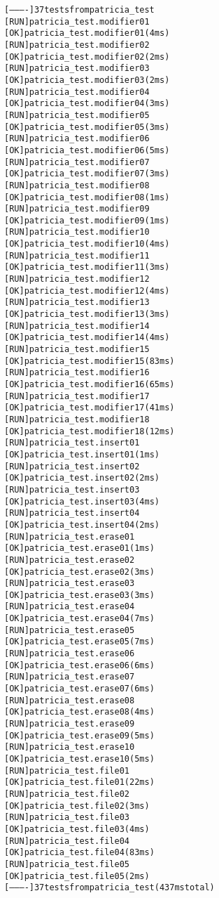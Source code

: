 \begin{alltt}
[----------] 37 tests from patricia_test
[ RUN      ] patricia_test.modifier01
[       OK ] patricia_test.modifier01 (4 ms)
[ RUN      ] patricia_test.modifier02
[       OK ] patricia_test.modifier02 (2 ms)
[ RUN      ] patricia_test.modifier03
[       OK ] patricia_test.modifier03 (2 ms)
[ RUN      ] patricia_test.modifier04
[       OK ] patricia_test.modifier04 (3 ms)
[ RUN      ] patricia_test.modifier05
[       OK ] patricia_test.modifier05 (3 ms)
[ RUN      ] patricia_test.modifier06
[       OK ] patricia_test.modifier06 (5 ms)
[ RUN      ] patricia_test.modifier07
[       OK ] patricia_test.modifier07 (3 ms)
[ RUN      ] patricia_test.modifier08
[       OK ] patricia_test.modifier08 (1 ms)
[ RUN      ] patricia_test.modifier09
[       OK ] patricia_test.modifier09 (1 ms)
[ RUN      ] patricia_test.modifier10
[       OK ] patricia_test.modifier10 (4 ms)
[ RUN      ] patricia_test.modifier11
[       OK ] patricia_test.modifier11 (3 ms)
[ RUN      ] patricia_test.modifier12
[       OK ] patricia_test.modifier12 (4 ms)
[ RUN      ] patricia_test.modifier13
[       OK ] patricia_test.modifier13 (3 ms)
[ RUN      ] patricia_test.modifier14
[       OK ] patricia_test.modifier14 (4 ms)
[ RUN      ] patricia_test.modifier15
[       OK ] patricia_test.modifier15 (83 ms)
[ RUN      ] patricia_test.modifier16
[       OK ] patricia_test.modifier16 (65 ms)
[ RUN      ] patricia_test.modifier17
[       OK ] patricia_test.modifier17 (41 ms)
[ RUN      ] patricia_test.modifier18
[       OK ] patricia_test.modifier18 (12 ms)
[ RUN      ] patricia_test.insert01
[       OK ] patricia_test.insert01 (1 ms)
[ RUN      ] patricia_test.insert02
[       OK ] patricia_test.insert02 (2 ms)
[ RUN      ] patricia_test.insert03
[       OK ] patricia_test.insert03 (4 ms)
[ RUN      ] patricia_test.insert04
[       OK ] patricia_test.insert04 (2 ms)
[ RUN      ] patricia_test.erase01
[       OK ] patricia_test.erase01 (1 ms)
[ RUN      ] patricia_test.erase02
[       OK ] patricia_test.erase02 (3 ms)
[ RUN      ] patricia_test.erase03
[       OK ] patricia_test.erase03 (3 ms)
[ RUN      ] patricia_test.erase04
[       OK ] patricia_test.erase04 (7 ms)
[ RUN      ] patricia_test.erase05
[       OK ] patricia_test.erase05 (7 ms)
[ RUN      ] patricia_test.erase06
[       OK ] patricia_test.erase06 (6 ms)
[ RUN      ] patricia_test.erase07
[       OK ] patricia_test.erase07 (6 ms)
[ RUN      ] patricia_test.erase08
[       OK ] patricia_test.erase08 (4 ms)
[ RUN      ] patricia_test.erase09
[       OK ] patricia_test.erase09 (5 ms)
[ RUN      ] patricia_test.erase10
[       OK ] patricia_test.erase10 (5 ms)
[ RUN      ] patricia_test.file01
[       OK ] patricia_test.file01 (22 ms)
[ RUN      ] patricia_test.file02
[       OK ] patricia_test.file02 (3 ms)
[ RUN      ] patricia_test.file03
[       OK ] patricia_test.file03 (4 ms)
[ RUN      ] patricia_test.file04
[       OK ] patricia_test.file04 (83 ms)
[ RUN      ] patricia_test.file05
[       OK ] patricia_test.file05 (2 ms)
[----------] 37 tests from patricia_test (437 ms total)


\end{alltt}
